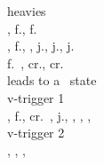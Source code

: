 \documentclass[a4paper,9pt,twocolumn]{letter}
\begin{document}
\vfill\eject
\noindent
heavies \\
\hpunch, f.\hpunch, f.\hpunch\cancel\vsone \\
\hpunch, f.\hpunch\cancel\vstwo, \up, j.\mpunch, j.\hpunch, j.\hkick\cancel\qcf\expunch \\
f.\hpunch\ \crush, cr.\mpunch\cancel\qcb\mpunch, cr.\lpunch\cancel\dragonpunch\hkick \\
\vsone\air\qcf\anypunch leads to a \crush\ state \\

\smallbreak
\noindent
v-trigger 1 \\
\hpunch, f.\hpunch\cancel\vtone, cr.\hpunch\ \back\back, j.\hkick, \qcb\hkick, \hkick, \qcb\expunch, \dragonpunch\exkick \\
v-trigger 2 \\
\hkick\cancel\vttwo\cancel\anykick, \anypunch, \anykick, \qcb\expunch \\
\end{document}

